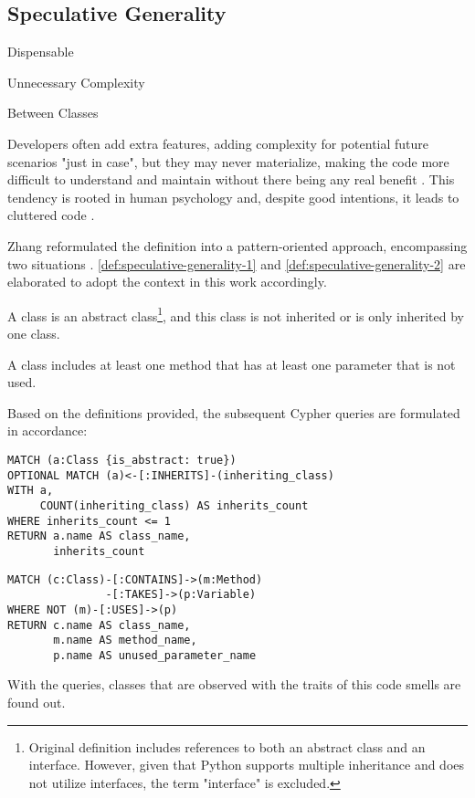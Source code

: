 \subsection{Speculative Generality}

\begin{description}[align=left, labelwidth=2.4cm]
  \item [Obstruction] Dispensable
  \item [Occurence] Unnecessary Complexity
  \item [Expanse] Between Classes 
\end{description}

Developers often add extra features, adding complexity for potential future scenarios "just in case", but they may never materialize, making the code more difficult to understand and maintain without there being any real benefit \cite{Martin_2018}. This tendency is rooted in human psychology and, despite good intentions, it leads to cluttered code \cite{Jerzyk_2023}.

Zhang \etal reformulated the definition into a pattern-oriented approach, encompassing two situations \cite{Zhang_2008}. \autoref{def:speculative-generality-1} and \ref{def:speculative-generality-2} are elaborated to adopt the context in this work accordingly.

\begin{definition}
A class is an abstract class\footnote{Original definition includes references to both an abstract class and an interface. However, given that Python supports multiple inheritance and does not utilize interfaces, the term "interface" is excluded.}, and this class is not inherited or is only inherited by one class.
\label{def:speculative-generality-1}
\end{definition}

\begin{definition}
A class includes at least one method that has at least one parameter that is not used.
\label{def:speculative-generality-2}
\end{definition}

Based on the definitions provided, the subsequent Cypher queries are formulated in accordance:

\begin{verbatim}
MATCH (a:Class {is_abstract: true})
OPTIONAL MATCH (a)<-[:INHERITS]-(inheriting_class)
WITH a, 
     COUNT(inheriting_class) AS inherits_count
WHERE inherits_count <= 1
RETURN a.name AS class_name, 
       inherits_count
\end{verbatim}


\begin{verbatim}
MATCH (c:Class)-[:CONTAINS]->(m:Method)
               -[:TAKES]->(p:Variable)
WHERE NOT (m)-[:USES]->(p)
RETURN c.name AS class_name, 
       m.name AS method_name, 
       p.name AS unused_parameter_name
\end{verbatim}

With the queries, classes that are observed with the traits of this code smells are found out.
